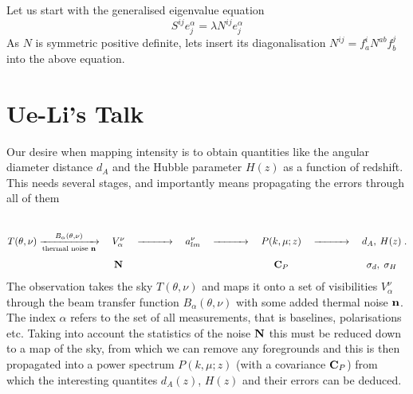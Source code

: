 \documentclass{revtex4}
\begin{document}
Let us start with the generalised eigenvalue equation
\begin{equation}
S^{ij} e_j^\alpha = \lambda N^{ij} e_j^\alpha
\end{equation}
As $N$ is symmetric positive definite, lets insert its diagonalisation
$N^{ij} = f^i_a N^{ab} f^j_b$ into the above equation.



\section{Ue-Li's Talk}

\newcommand{\vlrarrow}{\ensuremath{\xrightarrow{\qquad\quad}}}

Our desire when mapping \tcm{} intensity is to obtain quantities like
the angular diameter distance $d_A$ and the Hubble parameter $H(z)$ as
a function of redshift. This needs several stages, and importantly
means propagating the errors through all of them
\begin{equation}
T(\theta, \nu) \xrightarrow[\text{thermal noise }\vn]{B_\alpha(\theta,\nu)} \quad \begin{matrix} \\ \\V_\alpha^\nu \\ \\ \mN\end{matrix} \quad
\vlrarrow \quad a_{lm}^\nu  \quad \vlrarrow \quad \begin{matrix} \\ \\P(k, \mu; z) \\ \\ \mC_P \end{matrix}  \quad \vlrarrow \quad \begin{matrix} \\ \\  d_A,\: H(z)  \\ \\ \sigma_d, \; \sigma_H \end{matrix} \; .
\end{equation}
The observation takes the sky $T(\theta, \nu)$ and maps it onto a set
of visibilities $V_\alpha^\nu$ through the beam transfer function
$B_\alpha(\theta, \nu)$ with some added thermal noise $\mathbf{n}$. The index
$\alpha$ refers to the set of all measurements, that is baselines,
polarisations etc. Taking into account the statistics of the noise
$\mathbf{N}$ this must be reduced down to a map of the sky, from which we can
remove any foregrounds and this is then propagated into a power
spectrum $P(k, \mu; z)$ (with a covariance $\mathbf{C}_P$) from which the
interesting quantites $d_A(z)$, $H(z)$ and their errors can be
deduced.
\end{document}
